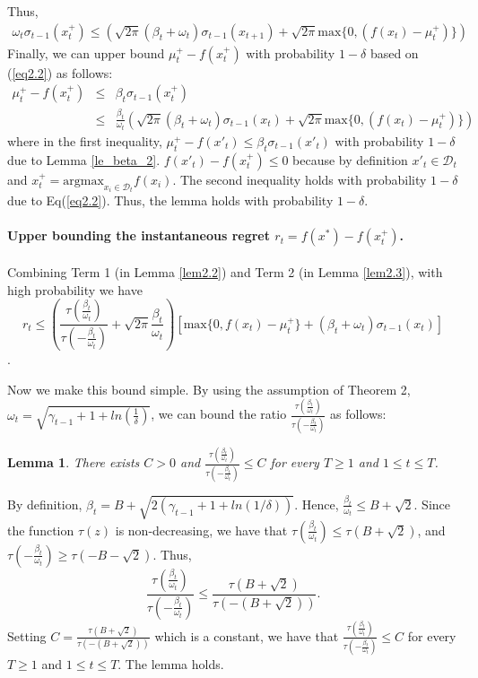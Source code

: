 \documentclass[twoside]{article}
\newtheorem{lemma}{Lemma}
\newenvironment{proof*}[1][\proofname]{
  \renewcommand\qedsymbol{\rule{2.5mm}{2.5mm}}
  \begin{proof}[#1]}{\end{proof}}
\begin{document}
\begin{proof*}
Thus,
\begin{eqnarray}
\omega_t \sigma_{t-1}(x^+_t) \le (\sqrt{2\pi}(\beta_t + \omega_t)\sigma_{t-1}(x_{t+1}) + \sqrt{2\pi} \text{max}\{0,(f(x_{t}) - \mu_t^+) \})
\label{eq2.2}
\end{eqnarray}
Finally, we can upper bound $\mu_t^+ - f(x^+_t)$  with probability $1 - \delta$ based on (\ref{eq2.2}) as follows:
\begin{eqnarray*}
\mu_t^+ - f(x^+_t) & \le  & \beta_t \sigma_{t-1}(x^+_t) \\
& \le & \frac{\beta_t}{\omega_t} (\sqrt{2\pi}(\beta_t + \omega_t)\sigma_{t-1}(x_{t}) + \sqrt{2\pi} \text{max}\{0,(f(x_{t}) - \mu_t^+) \})
\end{eqnarray*}
where in the first inequality, $\mu_t^+ - f(x'_t) \le \beta_t \sigma_{t-1}(x'_t)$ with probability $1 - \delta$ due to Lemma \ref{le_beta_2}. $f(x'_t) - f(x^+_t) \le 0$ because by definition $x'_t \in \mathcal D_t$ and $x^+_t = \text{argmax}_{x_i \in \mathcal D_t} f(x_i)$. The second inequality holds with probability $1 -\delta$ due to Eq(\ref{eq2.2}).
Thus, the lemma holds with probability $1 -\delta$.
\end{proof*}
\paragraph{Upper bounding the instantaneous regret $r_t = f(x^*) - f(x_t^+)$.}
Combining Term 1 (in Lemma \ref{lem2.2}) and Term 2 (in Lemma \ref{lem2.3}), with high probability we have
$$r_t  \le (\frac{\tau(\frac{\beta_t}{\omega_t})}{ \tau(-\frac{\beta_t}{\omega_t})} + \sqrt{2\pi}\frac{\beta_t}{\omega_t}) [\text{max}\{0, f(x_{t}) - \mu_t^+\} + (\beta_t+ \omega_t)\sigma_{t-1}(x_{t})]$$.

Now we make this bound simple. By using the assumption of Theorem 2, $\omega_t = \sqrt{\gamma_{t-1} + 1 + ln(\frac{1}{\delta})}$, we can bound the ratio $\frac{\tau(\frac{\beta_t}{\omega_t})}{ \tau(-\frac{\beta_t}{\omega_t})}$ as follows:
\begin{lemma}
There exists $C > 0$ and $\frac{\tau(\frac{\beta_t}{\omega_t})}{ \tau(-\frac{\beta_t}{\omega_t})} \le C$  for every $ T \ge 1$ and $1 \le t \le T$.
\end{lemma}
\begin{proof*}
By definition, $\beta_t = B + \sqrt{2(\gamma_{t-1} + 1 + ln(1/\delta))}$. Hence, $\frac{\beta_t}{\omega_t} \le B + \sqrt{2}$. Since the function $\tau(z)$ is non-decreasing, we have that $\tau(\frac{\beta_t}{\omega_t}) \le \tau (B + \sqrt{2})$, and $\tau(-\frac{\beta_t}{\omega_t}) \ge \tau (-B - \sqrt{2})$. Thus,
$$\frac{\tau(\frac{\beta_t}{\omega_t})}{ \tau(-\frac{\beta_t}{\omega_t})} \le \frac{\tau(B + \sqrt{2})}{\tau(-
(B + \sqrt{2}))}.$$
Setting $C = \frac{\tau(B + \sqrt{2})}{\tau(-
(B + \sqrt{2}))}$ which is a constant, we have that $\frac{\tau(\frac{\beta_t}{\omega_t})}{ \tau(-\frac{\beta_t}{\omega_t})} \le C$  for every $ T \ge 1$ and $1 \le t \le T$. The lemma holds.
\end{proof*}
\end{document}
